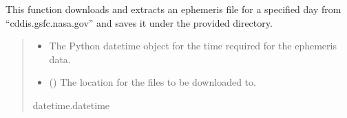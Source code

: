 \documentclass[letterpaper,10pt,english]{sphinxmanual}
\begin{document}
\begin{fulllineitems}
\label{\detokenize{modules/gps/ephemeris:qnav.gps.ephemeris.download_rinex_file}}
\pysigstartsignatures
{}
\pysigstopsignatures
\sphinxAtStartPar
This function downloads and extracts an ephemeris file for a specified
day from “cddis.gsfc.nasa.gov” and saves it under the provided directory.
\begin{quote}\begin{description}
\begin{itemize}
\item {} 
\sphinxAtStartPar
{} \textendash{} The Python datetime object for the time required for the
ephemeris data.

\item {} 
\sphinxAtStartPar
{} () \textendash{} The location for the files to be downloaded to.

\end{itemize}

\sphinxAtStartPar
datetime.datetime

\end{description}\end{quote}

\end{fulllineitems}

\end{document}
